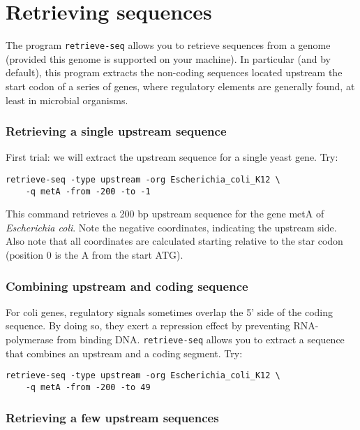\section{Retrieving sequences}

The program \texttt{retrieve-seq} allows you to retrieve sequences
from a genome (provided this genome is supported on your machine). In
particular (and by default), this program extracts the non-coding
sequences located upstream the start codon of a series of genes, where
regulatory elements are generally found, at least in microbial
organisms.

\subsubsection{Retrieving a single upstream sequence}
First trial: we will extract the upstream sequence for a single yeast
gene. Try:

\begin{verbatim}
retrieve-seq -type upstream -org Escherichia_coli_K12 \
    -q metA -from -200 -to -1
\end{verbatim}

This command retrieves a 200 bp upstream sequence for the gene metA of
\textit{Escherichia coli}. Note the negative coordinates, indicating the
upstream side. Also note that all coordinates are calculated starting
relative to the star codon (position 0 is the A from the start ATG).

\subsubsection{Combining upstream and coding sequence}
For coli genes, regulatory signals sometimes overlap the 5' side of
the coding sequence. By doing so, they exert a repression effect by
preventing RNA-polymerase from binding DNA. \texttt{retrieve-seq}
allows you to extract a sequence that combines an upstream and a
coding segment. Try:

\begin{verbatim}
retrieve-seq -type upstream -org Escherichia_coli_K12 \
    -q metA -from -200 -to 49
\end{verbatim}

\subsubsection{Retrieving a few upstream sequences}

